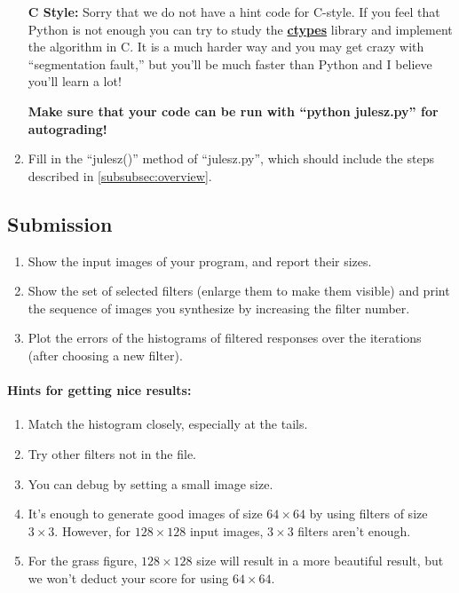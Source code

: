 \documentclass[11pt]{article}
\begin{document}
\begin{enumerate}
\begin{enumerate}
\begin{enumerate}
        \end{enumerate}
    \end{enumerate}
    \textbf{C Style:}
    Sorry that we do not have a hint code for C-style. If you feel that Python is not enough you can try to study the \href{https://docs.python.org/3/library/ctypes.html}{\textbf{ctypes}} library and implement the algorithm in C. It is a much harder way and you may get crazy with ``segmentation fault,'' but you'll be much faster than Python and I believe you'll learn a lot!

    
    \textbf{Make sure that your code can be run with ``python julesz.py'' for autograding!}
    \item Fill in the ``julesz()'' method of ``julesz.py'', which should include the steps described in \cref{subsubsec:overview}.

\end{enumerate}

\subsection{Submission}

\begin{enumerate}
    \item Show the input images of your program, and report their sizes.
    \item Show the set of selected filters (enlarge them to make them visible) and print the sequence of images you synthesize by increasing the filter number.
    \item  Plot the errors of the histograms of filtered responses over the iterations (after choosing a new filter).
\end{enumerate}

\paragraph{Hints for getting nice results:}
\begin{enumerate}
    \item Match the histogram closely, especially at the tails.

\item  Try other filters not in the file.
 
\item  You can debug by setting a small image size.
 
\item  It's enough to generate good images of size $64 \times 64$ by using filters of size $3 \times 3$. However, for $128 \times 128$ input images, $3 \times 3$ filters aren't enough.

\item  For the grass figure, $128 \times 128$ size will result in a more beautiful result, but we won't deduct your score for using $64 \times 64$.
\end{enumerate}
\end{document}
